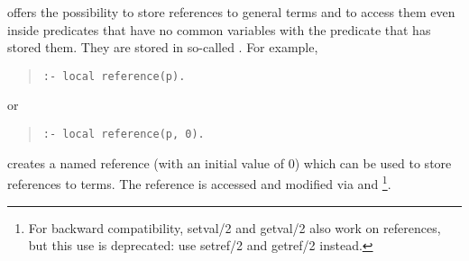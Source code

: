 {\eclipse} offers the possibility to store references to general terms
and to access them even inside predicates that have no common variables
with the predicate that has stored them.
They are stored in so-called .%
For example,
\begin{quote}
\begin{verbatim}
:- local reference(p).
\end{verbatim}
\end{quote}
or
\begin{quote}
\begin{verbatim}
:- local reference(p, 0).
\end{verbatim}
\end{quote}
creates a named reference  (with an initial value of 0)
which can be used to store references to terms.
The reference is accessed and modified
via 
and \footnote{
For backward compatibility, setval/2 and getval/2 also work on references,
but this use is deprecated: use setref/2 and getref/2 instead.
}.

